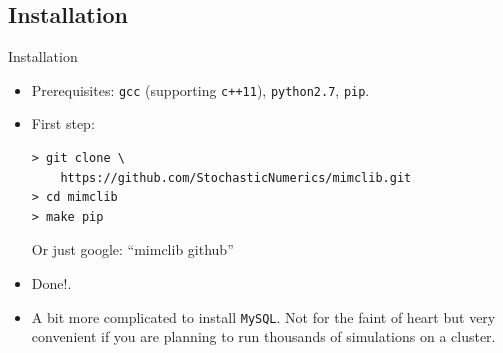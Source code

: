 \subsection{Installation}


\begin{frame}[fragile]{Installation}
\begin{itemize}
  \item Prerequisites: \texttt{gcc} (supporting \texttt{c++11}), \texttt{python2.7}, \texttt{pip}.
  \item First step:
\begin{verbatim}
> git clone \
    https://github.com/StochasticNumerics/mimclib.git
> cd mimclib
> make pip
\end{verbatim}
    Or just google: ``mimclib github''
  \item Done!.
  \item A bit more complicated to install \texttt{MySQL}. Not for the
    faint of heart but very convenient if you are planning to run
    thousands of simulations on a cluster.
\end{itemize}
\end{frame}


